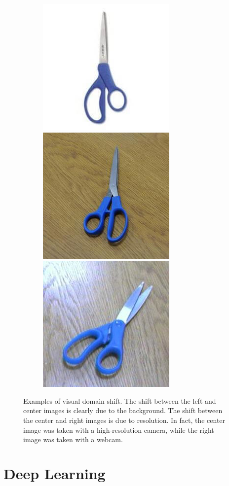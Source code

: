 \documentclass[../main.tex]{subfiles}
\begin{document}
    \begin{figure}[h!]
        \centering

        \begin{subfigure}{\linewidth}
        	\includegraphics[width=.3\linewidth]{img/amazon-scissor.png}\label{fig:amazon-scissor}\hfill
        	\includegraphics[width=.3\linewidth]{img/dslr-scissor.png}\label{fig:dslr-scissor}\hfill
            \includegraphics[width=.3\linewidth]{img/webcam-scissor.png}\label{fig:webcam-scissor}
        \end{subfigure}

        \caption{Examples of visual domain shift. The shift between the left and center images is clearly
            due to the background. The shift between the center and right images is due to resolution. In fact, the center
            image was taken with a high-resolution camera, while the right image was taken with a webcam.}\label{fig:domain-shift-office}
	\end{figure}

    \section{Deep Learning}\label{sec:deeplearning}
\end{document}
